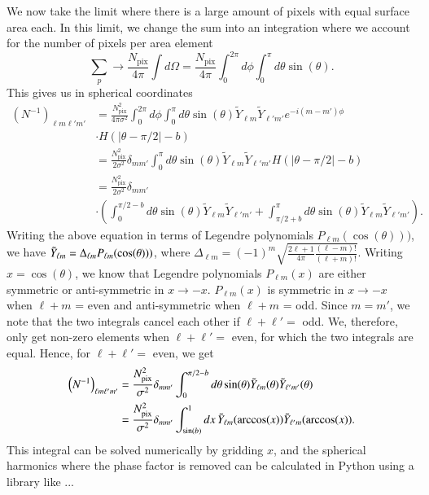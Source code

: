 \documentclass[twocolumn]{../common/aa}
\begin{document}
We now take the limit where there is a large amount of pixels with equal surface area each. In this limit, we change the sum into an integration where we account for the number of pixels per area element
\begin{equation}
\sum_p \rightarrow \frac{N_{\mathrm{pix}}}{4\pi}\int d\Omega  = \frac{N_{\mathrm{pix}}}{4\pi}\int_{0}^{2\pi} d\phi \int_{0}^{\pi} d\theta \sin(\theta).
\end{equation}
This gives us in spherical coordinates
\begin{align}
\nonumber
\left(N^{-1}\right)_{\ell m \ell' m'} &= \frac{N_{\mathrm{pix}}^2}{4\pi \sigma^2}\int_{0}^{2\pi} d\phi \int_{0}^{\pi} d\theta \sin(\theta)\tilde{Y}_{\ell m}  \tilde{Y}_{\ell' m'}  e^{-i(m-m')\phi}
\\
\nonumber
&\cdot H(|\theta -\pi/2|-b)\\
\nonumber
&= \frac{N_{\mathrm{pix}}^2}{2\sigma^2} \delta_{mm'}\int_{0}^{\pi} d\theta \sin(\theta)\tilde{Y}_{\ell m}  \tilde{Y}_{\ell' m'} H(|\theta -\pi/2|-b)\\
\nonumber
&= \frac{N_{\mathrm{pix}}^2}{2\sigma^2} \delta_{mm'}\\
&\cdot \left(\int_{0}^{\pi/2-b} d\theta \sin(\theta) \tilde{Y}_{\ell m}  \tilde{Y}_{\ell' m'}+\int_{\pi/2+b}^{\pi} d\theta \sin(\theta)\tilde{Y}_{\ell m}  \tilde{Y}_{\ell' m'}\right).
\end{align}
Writing the above equation in terms of Legendre polynomials $P_{\ell m}(\cos(\theta)))$, we have
$\Tilde{Y}_{\ell m} = \Delta_{\ell m}P_{\ell m}(\cos(\theta)))$, where ${\Delta_{\ell m}=(-1)^m \sqrt{\frac{2\ell+1}{4\pi}\frac{(\ell - m)!}{(\ell+m)!}}}$.
 Writing $x=\cos(\theta)$, we know that Legendre polynomials $P_{\ell m}(x)$ are either symmetric or anti-symmetric in $x\rightarrow-x$. $P_{\ell m}(x)$ is symmetric in $x \rightarrow -x$ when $\ell+m$ = even and anti-symmetric when $\ell+m$ = odd. Since $m=m'$, we note that the two integrals cancel each other if $\ell+\ell' =$ odd. We, therefore, only get non-zero elements when $\ell + \ell' =$ even, for which the two integrals are equal. Hence, for $\ell + \ell'=$ even, we get
\begin{align}
\nonumber
\left(N^{-1}\right)_{\ell m \ell' m'} &= \frac{N_{\mathrm{pix}}^2}{\sigma^2} \delta_{mm'}\int_{0}^{\pi/2-b} d\theta \sin(\theta)\Tilde{Y}_{\ell m}(\theta)\Tilde{Y}_{\ell' m'}(\theta)\\
\label{eq:finished_n_inv}
&=\frac{N_{\mathrm{pix}}^2}{\sigma^2} \delta_{mm'}\int_{\sin(b)}^{1} dx \, \Tilde{Y}_{\ell m}(\arccos(x)) \Tilde{Y}_{\ell' m}(\arccos(x)).
\end{align}
This integral can be solved numerically by gridding $x$, and the spherical harmonics where the phase factor is removed can be calculated in Python using a library like ...
\end{document}
